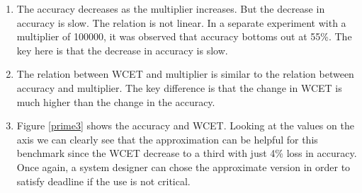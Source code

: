 \begin{enumerate}
\item The accuracy decreases as the multiplier increases. But the decrease in accuracy is slow. The relation is not linear. In a separate experiment with a multiplier of 100000, it was observed that accuracy bottoms out at 55\%. The key here is that the decrease in accuracy is slow.
\item The relation between WCET and multiplier is similar to the relation between accuracy and multiplier. The key difference is that the change in WCET is much higher than the change in the accuracy.
\item Figure \ref{prime3} shows the accuracy and WCET. Looking at the values on the axis we can clearly see that the approximation can be helpful for this benchmark since the WCET decrease to a third with just 4\% loss in accuracy. Once again, a system designer can chose the approximate version in order to satisfy deadline if the use is not critical.
\end{enumerate}




